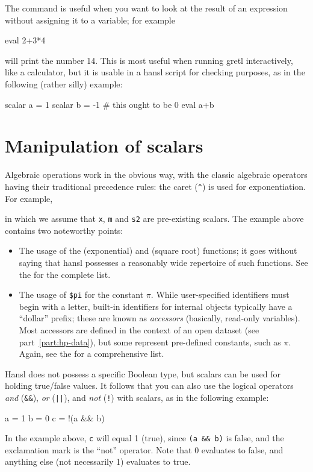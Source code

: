
The  command is useful when you want to look at the result
of an expression without assigning it to a variable; for example
\begin{code}
  eval 2+3*4
\end{code}
will print the number 14. This is most useful when running gretl
interactively, like a calculator, but it is usable in a hansl script
for checking purposes, as in the following (rather silly) example:
\begin{code}
  scalar a = 1
  scalar b = -1
  # this ought to be 0
  eval a+b
\end{code}

\section{Manipulation of scalars}

Algebraic operations work in the obvious way, with the classic
algebraic operators having their traditional precedence rules: the
caret (\verb|^|) is used for exponentiation. For example,
in which we assume that \texttt{x}, \texttt{m} and \texttt{s2} are
pre-existing scalars. The example above contains two noteworthy
points:
\begin{itemize}
\item The usage of the  (exponential) and  (square
  root) functions; it goes without saying that hansl possesses a
  reasonably wide repertoire of such functions. See the \GCR{} for the
  complete list.
\item The usage of \verb|$pi| for the constant $\pi$. While
  user-specified identifiers must begin with a letter, built-in
  identifiers for internal objects typically have a ``dollar'' prefix;
  these are known as \emph{accessors} (basically, read-only
  variables).  Most accessors are defined in the context of an open
  dataset (see part~\ref{part:hp-data}), but some represent
  pre-defined constants, such as $\pi$. Again, see the \GCR{} for a
  comprehensive list.
\end{itemize}

Hansl does not possess a specific Boolean type, but scalars can be
used for holding true/false values. It follows that you can also use
the logical operators \emph{and} (\verb|&&|), \emph{or} (\verb+||+),
and \emph{not} (\verb|!|) with scalars, as in the following example:
\begin{code}
  a = 1
  b = 0
  c = !(a && b) 
\end{code}
In the example above, \texttt{c} will equal 1 (true), since
\verb|(a && b)| is false, and the exclamation mark is the ``not''
operator.  Note that 0 evaluates to false, and anything else (not
necessarily 1) evaluates to true.

